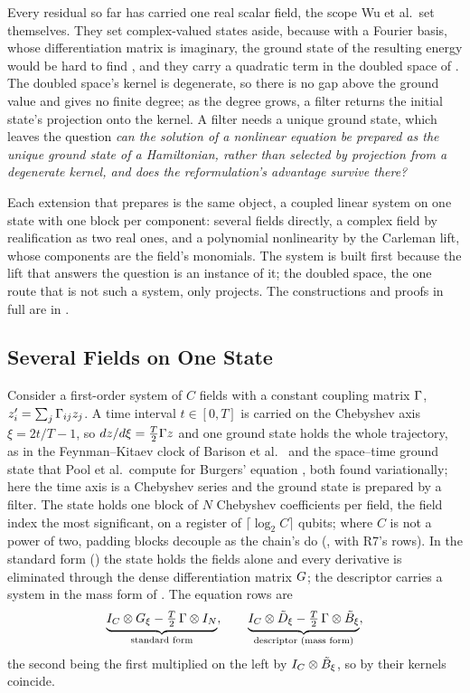 Every residual so far has carried one real scalar field, the scope Wu et al.\ set themselves. They set complex-valued states aside, because with a Fourier basis, whose differentiation matrix is imaginary, the ground state of the resulting energy would be hard to find \cite{wu2025pihm}, and they carry a quadratic term in the doubled space of . The doubled space's kernel is degenerate, so there is no gap above the ground value and  gives no finite degree; as the degree grows, a filter returns the initial state's projection onto the kernel. A filter needs a unique ground state, which leaves the question \emph{can the solution of a nonlinear equation be prepared as the unique ground state of a Hamiltonian, rather than selected by projection from a degenerate kernel, and does the reformulation's advantage survive there?}

Each extension that prepares is the same object, a coupled linear system on one state with one block per component: several fields directly, a complex field by realification as two real ones, and a polynomial nonlinearity by the Carleman lift, whose components are the field's monomials. The system is built first because the lift that answers the question is an instance of it; the doubled space, the one route that is not such a system, only projects. The constructions and proofs in full are in .

\subsection{Several Fields on One State}
\label{sec:systems-fields}

Consider a first-order system of $C$ fields with a constant coupling matrix $\Gamma$, $z_i'=\sum_j\Gamma_{ij}z_j$. A time interval $t\in[0,T]$ is carried on the Chebyshev axis $\xi=2t/T-1$, so $dz/d\xi=\tfrac T2\Gamma z$ and one ground state holds the whole trajectory, as in the Feynman--Kitaev clock of Barison et al.\ \cite{barison2022variational} and the space--time ground state that Pool et al.\ compute for Burgers' equation \cite{pool2024nonlinear}, both found variationally; here the time axis is a Chebyshev series and the ground state is prepared by a filter. The state holds one block of $N$ Chebyshev coefficients per field, the field index the most significant, on a register of $\lceil\log_2C\rceil$ qubits; where $C$ is not a power of two, padding blocks decouple as the chain's do (, with R7's rows). In the standard form () the state holds the fields alone and every derivative is eliminated through the dense differentiation matrix $G$; the descriptor carries a system in the mass form of . The equation rows are
\begin{equation}
    \underbrace{I_C\otimes G_\xi-\tfrac T2\,\Gamma\otimes I_N}_{\text{standard form}},
    \qquad
    \underbrace{I_C\otimes\tilde{D}_\xi-\tfrac T2\,\Gamma\otimes\tilde{B}_\xi}_{\text{descriptor (mass form)}},
    \label{eq:system-rows}
\end{equation}
the second being the first multiplied on the left by $I_C\otimes\tilde{B}_\xi$, so by  their kernels coincide.

